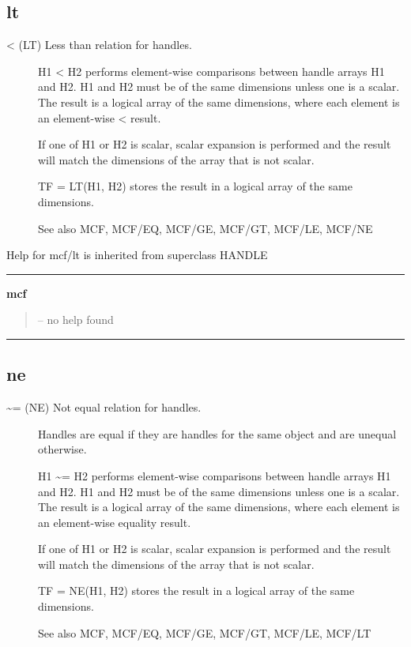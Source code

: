 \documentclass[letterpaper,10pt,english]{sphinxmanual}
\begin{document}
\subsection{lt}
\label{classes/utils/@mcf/mcf:id6}\label{classes/utils/@mcf/mcf:lt}\begin{description}
\item[{\textless{} (LT)   Less than relation for handles.}] \leavevmode
H1 \textless{} H2 performs element-wise comparisons between handle arrays H1 and
H2.  H1 and H2 must be of the same dimensions unless one is a scalar.
The result is a logical array of the same dimensions, where each
element is an element-wise \textless{} result.

If one of H1 or H2 is scalar, scalar expansion is performed and the
result will match the dimensions of the array that is not scalar.

TF = LT(H1, H2) stores the result in a logical array of the same
dimensions.

See also MCF, MCF/EQ, MCF/GE, MCF/GT, MCF/LE, MCF/NE

\end{description}

Help for mcf/lt is inherited from superclass HANDLE


\bigskip\hrule{}\bigskip

\label{classes/utils/@mcf/mcf:mcf}
\textbf{mcf}
\begin{quote}

-- no help found
\end{quote}


\bigskip\hrule{}\bigskip



\subsection{ne}
\label{classes/utils/@mcf/mcf:id7}\label{classes/utils/@mcf/mcf:ne}\begin{description}
\item[{\textasciitilde{}= (NE)   Not equal relation for handles.}] \leavevmode
Handles are equal if they are handles for the same object and are
unequal otherwise.

H1 \textasciitilde{}= H2 performs element-wise comparisons between handle arrays H1
and H2.  H1 and H2 must be of the same dimensions unless one is a
scalar.  The result is a logical array of the same dimensions, where
each element is an element-wise equality result.

If one of H1 or H2 is scalar, scalar expansion is performed and the
result will match the dimensions of the array that is not scalar.

TF = NE(H1, H2) stores the result in a logical array of the same
dimensions.

See also MCF, MCF/EQ, MCF/GE, MCF/GT, MCF/LE, MCF/LT

\end{description}
\end{document}
